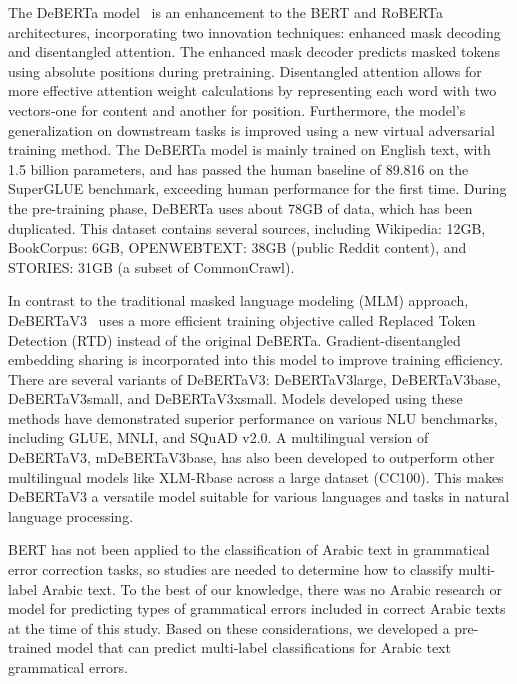 The DeBERTa model~\cite{he2020deberta} is an enhancement to the BERT and RoBERTa architectures, incorporating two innovation techniques: enhanced mask decoding and disentangled attention.  The enhanced mask decoder predicts masked tokens using absolute positions during pretraining. Disentangled attention allows for more effective attention weight calculations by representing each word with two vectors-one for content and another for position. Furthermore, the model's generalization on downstream tasks is improved using a new virtual adversarial training method. The DeBERTa model is mainly trained on English text, with 1.5 billion parameters, and has passed the human baseline of 89.816 on the SuperGLUE benchmark, exceeding human performance for the first time.  During the pre-training phase, DeBERTa uses about 78GB of data, which has been duplicated. This dataset contains several sources, including Wikipedia: 12GB, BookCorpus: 6GB, OPENWEBTEXT: 38GB (public Reddit content), and STORIES: 31GB (a subset of CommonCrawl).


In contrast to the traditional masked language modeling (MLM) approach, DeBERTaV3~\cite{he2021debertav3} uses a more efficient training objective called Replaced Token Detection (RTD) instead of the original DeBERTa. Gradient-disentangled embedding sharing is incorporated into this model to improve training efficiency. There are several variants of DeBERTaV3: DeBERTaV3large, DeBERTaV3base, DeBERTaV3small, and DeBERTaV3xsmall. Models developed using these methods have demonstrated superior performance on various NLU benchmarks, including GLUE, MNLI, and SQuAD v2.0. A multilingual version of DeBERTaV3, mDeBERTaV3base, has also been developed to outperform other multilingual models like XLM-Rbase across a large dataset (CC100). This makes DeBERTaV3 a versatile model suitable for various languages and tasks in natural language processing.

BERT has not been applied to the classification of Arabic text in grammatical error correction tasks, so studies are needed to determine how to classify multi-label Arabic text. To the best of our knowledge, there was no Arabic research or model for predicting types of grammatical errors included in correct Arabic texts at the time of this study. Based on these considerations, we developed a pre-trained model that can predict multi-label classifications for Arabic text grammatical errors.

